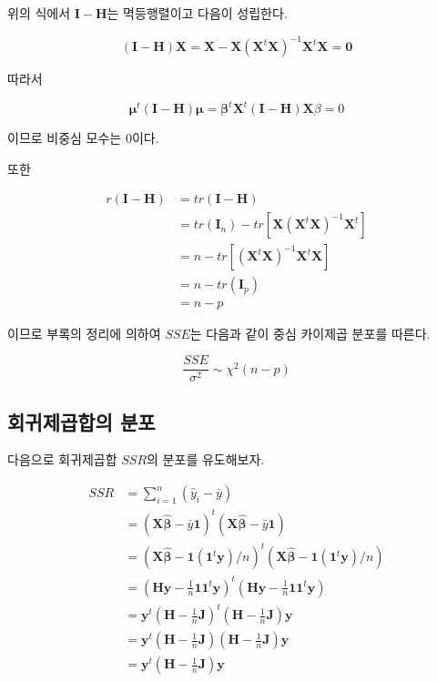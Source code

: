 \documentclass[
]{book}
\theoremstyle{definition}
\theoremstyle{definition}
\theoremstyle{definition}
\theoremstyle{definition}
\theoremstyle{remark}
\begin{document}
위의 식에서 \(\bm I - \bm H\)는 멱등행렬이고 다음이 성립한다.

\begin{equation*}
(\bm I - \bm H) \bm X = \bm X - \bm X (\bm X^t \bm X)^{-1} \bm X^t \bm X = \bm 0
\end{equation*}

따라서

\begin{equation*}
\bm \mu^t (\bm I - \bm H)  \bm \mu = \bm \beta^t \bm X^t (\bm I - \bm H) \bm X \beta =0
\end{equation*}

이므로 비중심 모수는 0이다.

또한

\begin{align*}
r(\bm I - \bm H) & = tr(\bm I - \bm H) \\
& = tr(\bm I_n) - tr \left [ \bm X (\bm X^t \bm X)^{-1} \bm X^t \right ] \\
& = n-tr \left [ (\bm X^t \bm X)^{-1} \bm X^t \bm X \right ]
\\
&= n-tr (\bm I_p ) \\
& = n-p
\end{align*}

이므로 부록의 정리에 의하여 \(SSE\)는 다음과 같이 중심 카이제곱 분포를
따른다.

\begin{equation}
\frac{SSE}{\sigma^2} \sim \chi^2(n-p)
\label{eq:distsse}
\end{equation}

\hypertarget{uxd68cuxadc0uxc81cuxacf1uxd569uxc758-uxbd84uxd3ec}{%
\subsection{회귀제곱합의 분포}\label{uxd68cuxadc0uxc81cuxacf1uxd569uxc758-uxbd84uxd3ec}}

다음으로 회귀제곱합 \(SSR\)의 분포를 유도해보자.

\begin{align*}
SSR & = \sum_{i=1}^n (\hat y_i - \bar y) \\
   & = (\bm X \hat {\bm \beta} - \bar y \bm 1 )^t (\bm X \hat {\bm \beta} - \bar y \bm 1 ) \\
   & = \left ( \bm X \hat {\bm \beta} -  \bm 1 (\bm 1^t \bm y)/n \right )^t   \left ( \bm X \hat {\bm \beta} -  \bm 1 (\bm 1^t \bm y)/n \right )\\
   & = \left ( \bm H \bm y-  \tfrac{1}{n} \bm 1 \bm 1^t \bm y \right )^t   \left ( \bm H \bm y-  \tfrac{1}{n} \bm 1 \bm 1^t \bm y \right ) \\
    & =  \bm y^t \left ( \bm H  -  \tfrac{1}{n} \bm J \right )^t   \left ( \bm H  -  \tfrac{1}{n} \bm J \right ) \bm y \\
    & = \bm y^t \left ( \bm H  -  \tfrac{1}{n} \bm J \right )   \left ( \bm H  -  \tfrac{1}{n} \bm J \right ) \bm y \\
     & = \bm y^t  \left ( \bm H  -  \tfrac{1}{n} \bm J \right ) \bm y \\
\end{align*}
\end{document}
